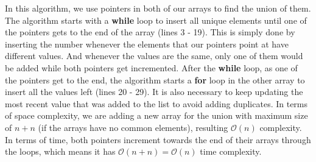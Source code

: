     In this algorithm, we use pointers in both of our arrays to find the union of them.
    The algorithm starts with a \textbf{while} loop to insert all unique elements until one of the pointers gets to the end of the array (lines 3 - 19).
    This is simply done by inserting the number whenever the elements that our pointers point at have different values.
    And whenever the values are the same, only one of them would be added while both pointers get incremented. After the \textbf{while} loop,
    as one of the pointers get to the end, the algorithm starts a \textbf{for} loop in the other array to insert all the values left (lines 20 - 29).
    It is also necessary to keep updating the most recent value that was added to the list to avoid adding duplicates. In terms of space complexity, we are adding a new array 
    for the union with maximum size of $n+n$ (if the arrays have no common elements), resulting $\mathcal{O}(n)$ complexity. In terms of time, both pointers
    increment towards the end of their arrays through the loops, which means it has $\mathcal{O}(n+n)=\mathcal{O}(n)$ time complexity. \\
    
